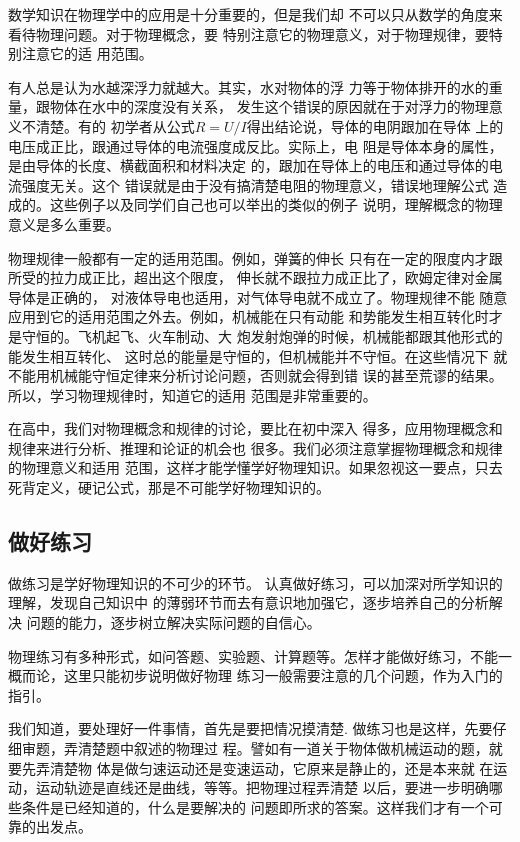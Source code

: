     数学知识在物理学中的应用是十分重要的，但是我们却
不可以只从数学的角度来看待物理问题。对于物理概念，要
特别注意它的物理意义，对于物理规律，要特别注意它的适
用范围。

    有人总是认为水越深浮力就越大。其实，水对物体的浮
力等于物体排开的水的重量，跟物体在水中的深度没有关系，
发生这个错误的原因就在于对浮力的物理意义不清楚。有的
初学者从公式$R=U/I$得出结论说，导体的电阴跟加在导体
上的电压成正比，跟通过导体的电流强度成反比。实际上，电
阻是导体本身的属性，是由导体的长度、横截面积和材料决定
的，跟加在导体上的电压和通过导体的电流强度无关。这个
错误就是由于没有搞清楚电阻的物理意义，错误地理解公式
造成的。这些例子以及同学们自己也可以举出的类似的例子
说明，理解概念的物理意义是多么重要。

    物理规律一般都有一定的适用范围。例如，弹簧的伸长
只有在一定的限度内才跟所受的拉力成正比，超出这个限度，
伸长就不跟拉力成正比了，欧姆定律对金属导体是正确的，
对液体导电也适用，对气体导电就不成立了。物理规律不能
随意应用到它的适用范围之外去。例如，机械能在只有动能
和势能发生相互转化时才是守恒的。飞机起飞、火车制动、大
炮发射炮弹的时候，机械能都跟其他形式的能发生相互转化、
这时总的能量是守恒的，但机械能并不守恒。在这些情况下
就不能用机械能守恒定律来分析讨论问题，否则就会得到错
误的甚至荒谬的结果。所以，学习物理规律时，知道它的适用
范围是非常重要的。

    在高中，我们对物理概念和规律的讨论，要比在初中深入
得多，应用物理概念和规律来进行分析、推理和论证的机会也
很多。我们必须注意掌握物理概念和规律的物理意义和适用
范围，这样才能学懂学好物理知识。如果忽视这一要点，只去
死背定义，硬记公式，那是不可能学好物理知识的。


    \subsection*{做好练习}

做练习是学好物理知识的不可少的环节。
认真做好练习，可以加深对所学知识的理解，发现自己知识中
的薄弱环节而去有意识地加强它，逐步培养自己的分析解决
问题的能力，逐步树立解决实际问题的自信心。

物理练习有多种形式，如问答题、实验题、计算题等。怎样才能做好练习，不能一概而论，这里只能初步说明做好物理
练习一般需要注意的几个问题，作为入门的指引。

    我们知道，要处理好一件事情，首先是要把情况摸清楚.
做练习也是这样，先要仔细审题，弄清楚题中叙述的物理过
程。譬如有一道关于物体做机械运动的题，就要先弄清楚物
体是做匀速运动还是变速运动，它原来是静止的，还是本来就
在运动，运动轨迹是直线还是曲线，等等。把物理过程弄清楚
以后，要进一步明确哪些条件是已经知道的，什么是要解决的
问题即所求的答案。这样我们才有一个可靠的出发点。

